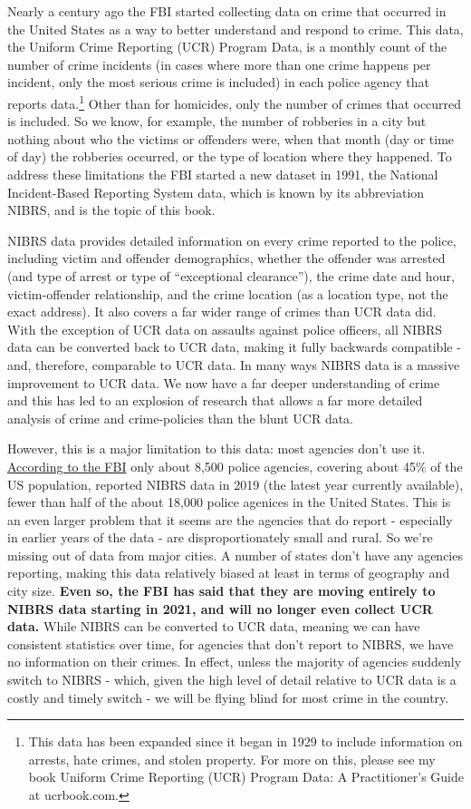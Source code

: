 \documentclass[
  12pt,
  openany]{book}
\begin{document}
Nearly a century ago the FBI started collecting data on crime that occurred in the United States as a way to better understand and respond to crime. This data, the Uniform Crime Reporting (UCR) Program Data, is a monthly count of the number of crime incidents (in cases where more than one crime happens per incident, only the most serious crime is included) in each police agency that reports data.\footnote{This data has been expanded since it began in 1929 to include information on arrests, hate crimes, and stolen property. For more on this, please see my book Uniform Crime Reporting (UCR) Program Data: A Practitioner's Guide at ucrbook.com.} Other than for homicides, only the number of crimes that occurred is included. So we know, for example, the number of robberies in a city but nothing about who the victims or offenders were, when that month (day or time of day) the robberies occurred, or the type of location where they happened. To address these limitations the FBI started a new dataset in 1991, the National Incident-Based Reporting System data, which is known by its abbreviation NIBRS, and is the topic of this book.

NIBRS data provides detailed information on every crime reported to the police, including victim and offender demographics, whether the offender was arrested (and type of arrest or type of ``exceptional clearance''), the crime date and hour, victim-offender relationship, and the crime location (as a location type, not the exact address). It also covers a far wider range of crimes than UCR data did. With the exception of UCR data on assaults against police officers, all NIBRS data can be converted back to UCR data, making it fully backwards compatible - and, therefore, comparable to UCR data. In many ways NIBRS data is a massive improvement to UCR data. We now have a far deeper understanding of crime and this has led to an explosion of research that allows a far more detailed analysis of crime and crime-policies than the blunt UCR data.

However, this is a major limitation to this data: most agencies don't use it. \href{https://www.fbi.gov/news/pressrel/press-releases/fbi-releases-2019-nibrs-crime-data}{According to the FBI} only about 8,500 police agencies, covering about 45\% of the US population, reported NIBRS data in 2019 (the latest year currently available), fewer than half of the about 18,000 police agenices in the United States. This is an even larger problem that it seems are the agencies that do report - especially in earlier years of the data - are disproportionately small and rural. So we're missing out of data from major cities. A number of states don't have any agencies reporting, making this data relatively biased at least in terms of geography and city size. \textbf{Even so, the FBI has said that they are moving entirely to NIBRS data starting in 2021, and will no longer even collect UCR data.} While NIBRS can be converted to UCR data, meaning we can have consistent statistics over time, for agencies that don't report to NIBRS, we have no information on their crimes. In effect, unless the majority of agencies suddenly switch to NIBRS - which, given the high level of detail relative to UCR data is a costly and timely switch - we will be flying blind for most crime in the country.
\end{document}
